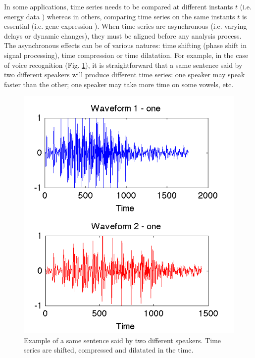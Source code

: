 In some applications, time series needs to be compared at different instants $t$ (i.e. energy data \cite{Najmeddine2012}) whereas in others, comparing time series on the same instants $t$ is essential (i.e. gene expression \cite{Chouakria2007}). When time series are asynchronous (i.e. varying delays or dynamic changes), they must be aligned before any analysis process. The asynchronous effects can be of various natures: time shifting (phase shift in signal processing), time compression or time dilatation. For example, in the case of voice recognition (Fig. \ref{fig:Voice_Example}), it is straightforward that a same sentence said by two different speakers will produce different time series: one speaker may speak faster than the other; one speaker may take more time on some vowels, etc.

\begin{figure}[h!]
\centering
\includegraphics[width=0.4\linewidth]{images/Voice_Example}
\caption{Example of a same sentence said by two different speakers. Time series are shifted, compressed and dilatated in the time.}
\label{fig:Voice_Example}
\end{figure}

